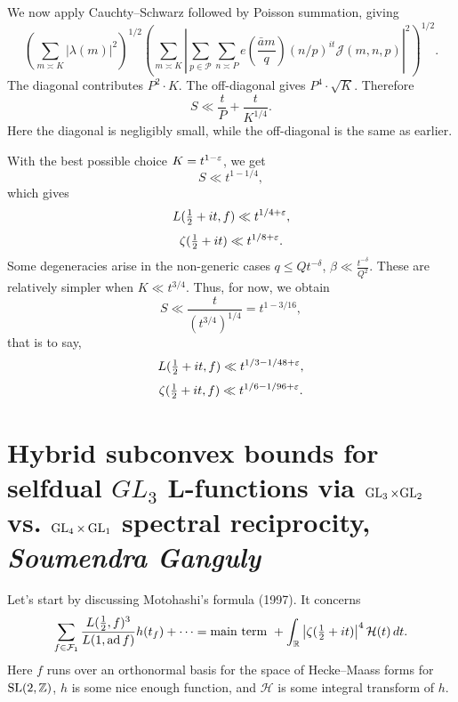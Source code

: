 \documentclass[reqno]{amsart} 
\begin{document}
We now apply Cauchty--Schwarz followed by Poisson summation, giving
\begin{equation*}
  \left( \sum_{m \asymp K}
    \left| \lambda(m) \right|^2\right)^{1/2}
  \left( \sum_{m \asymp K}
    \left| \sum_{p \in \mathcal{P}} \sum_{n \asymp P}
      e \left( \frac{\bar{a} m}{q} \right)
      (n/p)^{i t}
      \mathcal{J}(m, n, p)\right|^2\right)^{1/2}.
\end{equation*}
The diagonal contributes $P^2 \cdot K$.  The off-diagonal gives $P^4 \cdot \sqrt{K}$.  Therefore
\begin{equation*}
  S \ll \frac{t}{P} + \frac{t}{ K^{1/4}}.
\end{equation*}
Here the diagonal is negligibly small, while the off-diagonal is the same as earlier.

With the best possible choice $K = t^{1 - \varepsilon}$, we get
\begin{equation*}
  S \ll t^{1 - 1/4},
\end{equation*}
which gives
\begin{equation*}
  L(\tfrac{1}{2} + i t, f) \ll t^{1/4 + \varepsilon},
\end{equation*}
\begin{equation*}
  \zeta(\tfrac{1}{2} + i t) \ll t^{1/8 + \varepsilon}.
\end{equation*}
Some degeneracies arise in the non-generic cases $q \leq Q t^{- \delta}$, $\beta \ll \frac{t^{- \delta}}{Q^2}$.  These are relatively simpler when $K \ll t^{3/4}$.  Thus, for now, we obtain
\begin{equation*}
  S \ll \frac{t}{(t^{3/4})^{1/4}} = t^{1 - 3/16},
\end{equation*}
that is to say,
\begin{equation*}
  L(\tfrac{1}{2} + i t, f)
  \ll t^{1/3 - 1/48 + \varepsilon},
\end{equation*}
\begin{equation*}
  \zeta(\tfrac{1}{2} + i t, f)
  \ll t^{1/6 - 1/96 + \varepsilon}.
\end{equation*}

\section{Hybrid subconvex bounds for selfdual $GL_3$ L-functions via $\operatorname{GL}_3 \times \mathrm{GL}_2$ vs. $\operatorname{GL}_4 \times \operatorname{GL}_1$ spectral reciprocity, \textnormal{\emph{Soumendra Ganguly}}}

Let's start by discussing Motohashi's formula (1997).  It concerns
\begin{equation*}
  \sum_{f \in \mathcal{F}_1}
  \frac{L(\tfrac{1}{2} , f)^3}{ L(1, \operatorname{ad} f)}
  h(t_f) + \dotsb
  = \text{main term }
  +
  \int_{\mathbb{R}}
  \left| \zeta(\tfrac{1}{2} + i t) \right|^4 \mathcal{H}(t) \, d t.
\end{equation*}
Here $f$ runs over an orthonormal basis for the space of Hecke--Maass forms for $\operatorname{SL}(2,\mathbb{Z})$, $h$ is some nice enough function, and $\mathcal{H}$ is some integral transform of $h$.
\end{document}
